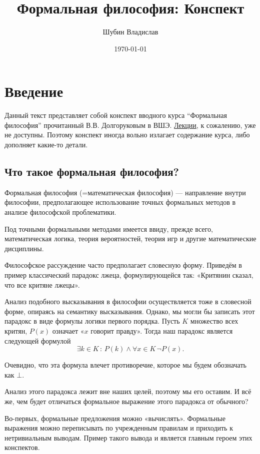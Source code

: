 \documentclass[openany]{book}
\date{\today}
\author{Шубин Владислав}
\title{Формальная философия: Конспект}
\theoremstyle{plain}
\theoremstyle{definition}
\begin{document}
\maketitle
\tableofcontents

\chapter{Введение}

Данный текст представляет собой конспект вводного курса ``Формальная философия'' прочитанный В.В. Долгоруковым в ВШЭ. \href{https://drive.google.com/drive/folders/14R_Xut-3dRLUAvHlE7vkMyW9hsI8oiwV}{Лекции}, к сожалению, уже не доступны. Поэтому конспект иногда вольно излагает содержание курса, либо дополняет какие-то детали.

\section{ Что такое формальная философия? }

Формальная философия (=математическая философия) — направление внутри философии, предполагающее использование точных формальных методов в анализе философской проблематики.

Под точными формальными методами имеется ввиду, прежде всего, математическая логика, теория вероятностей, теория игр и другие математические дисциплины.

Философское рассуждение часто предполагает словесную форму. Приведём в пример классический парадокс лжеца, формулирующейся так:
«Критянин сказал, что все критяне лжецы».

Анализ подобного высказывания в философии осуществляется тоже в словесной форме, опираясь на семантику высказывания. Однако, мы могли бы записать этот парадокс в виде формулы логики первого порядка. Пусть $K$ множество всех критян, \(P(x)\) означает «\(x\) говорит правду». Тогда наш парадокс является следующей формулой \[\exists k \in K \, : \, P(k) \land \forall x \in K \, \neg P(x).\]

\noindent Очевидно, что эта формула влечет противоречие, которое мы будем обозначать как $\bot$.

Анализ этого парадокса лежит вне наших целей, поэтому мы его оставим. И всё же, чем будет отличаться формальное выражение этого парадокса от обычного?

Во-первых, формальные предложения можно «вычислять». Формальные выражения можно переписывать по учрежденным правилам и приходить к нетривиальным выводам. Пример такого вывода и является главным героем этих конспектов.
\end{document}
